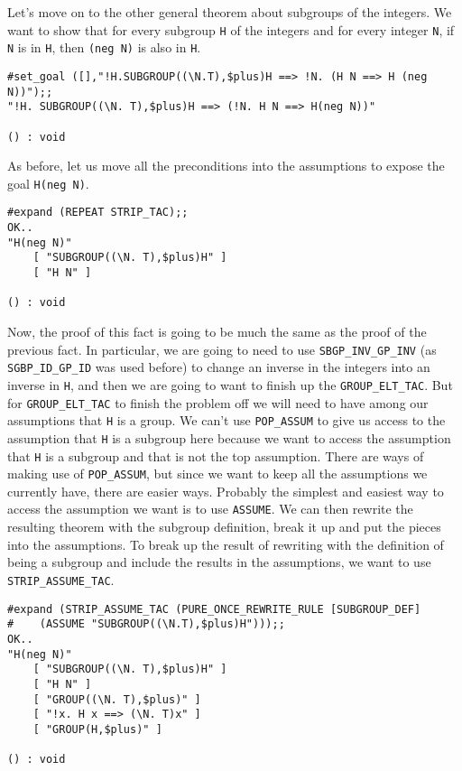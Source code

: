 Let's move on to the other general theorem about subgroups of the
integers.  We want to show that for every subgroup {\small\tt H} of
the integers and for every integer {\small\tt N}, if {\small\tt N} is
in {\small\tt H}, then {\small\verb+(neg N)+} is also in
{\small\tt H}.
\begin{session}
\begin{verbatim}
#set_goal ([],"!H.SUBGROUP((\N.T),$plus)H ==> !N. (H N ==> H (neg N))");;
"!H. SUBGROUP((\N. T),$plus)H ==> (!N. H N ==> H(neg N))"

() : void
\end{verbatim}
\end{session}

As before, let us move all the preconditions into the assumptions to
expose the goal {\small\verb+H(neg N)+}.
\begin{session}
\begin{verbatim}
#expand (REPEAT STRIP_TAC);;
OK..
"H(neg N)"
    [ "SUBGROUP((\N. T),$plus)H" ]
    [ "H N" ]

() : void
\end{verbatim}
\end{session}

Now, the proof of this fact is going to be much the same as the proof
of the previous fact.  In particular, we are going to need to use
{\small\verb+SBGP_INV_GP_INV+} (as {\small\verb+SGBP_ID_GP_ID+}
was used before) to change an inverse in the integers into an inverse
in {\small\tt H}, and then we are going to want to finish up the
{\small\verb+GROUP_ELT_TAC+}.  But for
{\small\verb+GROUP_ELT_TAC+} to finish the problem off we will need
to have among our assumptions that {\small\tt H} is a group.  We can't use
{\small\verb+POP_ASSUM+} to give us access to the assumption that
{\small\tt H} is a subgroup here because we want to access the
assumption that {\small\tt H} is a subgroup and that is not the top
assumption.  There are ways of making use of
{\small\verb+POP_ASSUM+}, but since we want to keep all the
assumptions we currently have, there are easier ways.  Probably the
simplest and easiest way to access the assumption we want is to use
{\small\verb+ASSUME+}.  We can then rewrite the resulting theorem
with the subgroup definition, break it up and put the pieces into the
assumptions.  To break up the result of rewriting with the definition
of being a subgroup and include the results in the assumptions, we
want to use {\small\verb+STRIP_ASSUME_TAC+}.

\begin{session}
\begin{verbatim}
#expand (STRIP_ASSUME_TAC (PURE_ONCE_REWRITE_RULE [SUBGROUP_DEF]
#    (ASSUME "SUBGROUP((\N.T),$plus)H")));;
OK..
"H(neg N)"
    [ "SUBGROUP((\N. T),$plus)H" ]
    [ "H N" ]
    [ "GROUP((\N. T),$plus)" ]
    [ "!x. H x ==> (\N. T)x" ]
    [ "GROUP(H,$plus)" ]

() : void
\end{verbatim}
\end{session}

